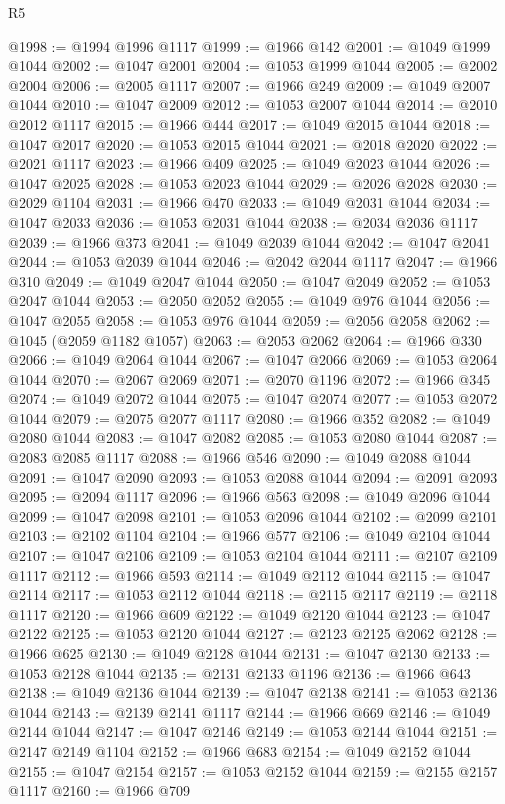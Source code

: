 \begin{lexlean}{R5}
\begin{coremodule}
@1998 := @1994 @1996 @1117
@1999 := @1966 @142
@2001 := @1049 @1999 @1044
@2002 := @1047 @2001
@2004 := @1053 @1999 @1044
@2005 := @2002 @2004
@2006 := @2005 @1117
@2007 := @1966 @249
@2009 := @1049 @2007 @1044
@2010 := @1047 @2009
@2012 := @1053 @2007 @1044
@2014 := @2010 @2012 @1117
@2015 := @1966 @444
@2017 := @1049 @2015 @1044
@2018 := @1047 @2017
@2020 := @1053 @2015 @1044
@2021 := @2018 @2020
@2022 := @2021 @1117
@2023 := @1966 @409
@2025 := @1049 @2023 @1044
@2026 := @1047 @2025
@2028 := @1053 @2023 @1044
@2029 := @2026 @2028
@2030 := @2029 @1104
@2031 := @1966 @470
@2033 := @1049 @2031 @1044
@2034 := @1047 @2033
@2036 := @1053 @2031 @1044
@2038 := @2034 @2036 @1117
@2039 := @1966 @373
@2041 := @1049 @2039 @1044
@2042 := @1047 @2041
@2044 := @1053 @2039 @1044
@2046 := @2042 @2044 @1117
@2047 := @1966 @310
@2049 := @1049 @2047 @1044
@2050 := @1047 @2049
@2052 := @1053 @2047 @1044
@2053 := @2050 @2052
@2055 := @1049 @976 @1044
@2056 := @1047 @2055
@2058 := @1053 @976 @1044
@2059 := @2056 @2058
@2062 := @1045 (@2059 @1182 @1057)
@2063 := @2053 @2062
@2064 := @1966 @330
@2066 := @1049 @2064 @1044
@2067 := @1047 @2066
@2069 := @1053 @2064 @1044
@2070 := @2067 @2069
@2071 := @2070 @1196
@2072 := @1966 @345
@2074 := @1049 @2072 @1044
@2075 := @1047 @2074
@2077 := @1053 @2072 @1044
@2079 := @2075 @2077 @1117
@2080 := @1966 @352
@2082 := @1049 @2080 @1044
@2083 := @1047 @2082
@2085 := @1053 @2080 @1044
@2087 := @2083 @2085 @1117
@2088 := @1966 @546
@2090 := @1049 @2088 @1044
@2091 := @1047 @2090
@2093 := @1053 @2088 @1044
@2094 := @2091 @2093
@2095 := @2094 @1117
@2096 := @1966 @563
@2098 := @1049 @2096 @1044
@2099 := @1047 @2098
@2101 := @1053 @2096 @1044
@2102 := @2099 @2101
@2103 := @2102 @1104
@2104 := @1966 @577
@2106 := @1049 @2104 @1044
@2107 := @1047 @2106
@2109 := @1053 @2104 @1044
@2111 := @2107 @2109 @1117
@2112 := @1966 @593
@2114 := @1049 @2112 @1044
@2115 := @1047 @2114
@2117 := @1053 @2112 @1044
@2118 := @2115 @2117
@2119 := @2118 @1117
@2120 := @1966 @609
@2122 := @1049 @2120 @1044
@2123 := @1047 @2122
@2125 := @1053 @2120 @1044
@2127 := @2123 @2125 @2062
@2128 := @1966 @625
@2130 := @1049 @2128 @1044
@2131 := @1047 @2130
@2133 := @1053 @2128 @1044
@2135 := @2131 @2133 @1196
@2136 := @1966 @643
@2138 := @1049 @2136 @1044
@2139 := @1047 @2138
@2141 := @1053 @2136 @1044
@2143 := @2139 @2141 @1117
@2144 := @1966 @669
@2146 := @1049 @2144 @1044
@2147 := @1047 @2146
@2149 := @1053 @2144 @1044
@2151 := @2147 @2149 @1104
@2152 := @1966 @683
@2154 := @1049 @2152 @1044
@2155 := @1047 @2154
@2157 := @1053 @2152 @1044
@2159 := @2155 @2157 @1117
@2160 := @1966 @709

\end{coremodule}
\end{lexlean}
